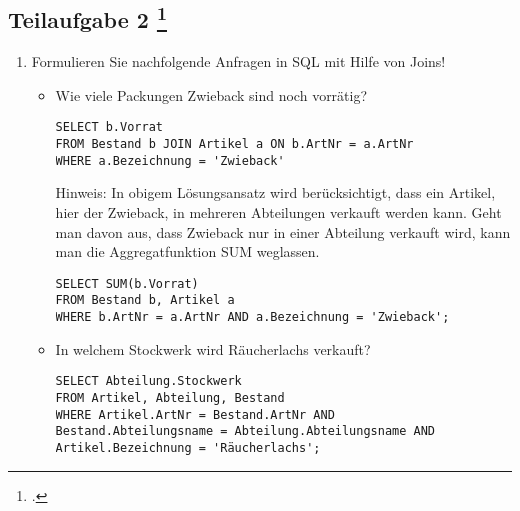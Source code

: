 \documentclass{lehramt-informatik-aufgabe}
\begin{document}
%

\subsection{Teilaufgabe 2
\footcite[Aufgabe 1: Kaufhaus again...]{db:ab:7}}

\begin{enumerate}


\item Formulieren Sie nachfolgende Anfragen in SQL mit Hilfe von Joins!

\begin{itemize}


\item Wie viele Packungen Zwieback sind noch vorrätig?

\begin{antwort}[richtig]
\begin{verbatim}
SELECT b.Vorrat
FROM Bestand b JOIN Artikel a ON b.ArtNr = a.ArtNr
WHERE a.Bezeichnung = 'Zwieback'
\end{verbatim}
\end{antwort}

\begin{antwort}[muster]
Hinweis: In obigem Lösungsansatz wird berücksichtigt, dass ein Artikel,
hier der Zwieback, in mehreren Abteilungen verkauft werden kann. Geht
man davon aus, dass Zwieback nur in einer Abteilung verkauft wird, kann
man die Aggregatfunktion SUM weglassen.
\begin{verbatim}
SELECT SUM(b.Vorrat)
FROM Bestand b, Artikel a
WHERE b.ArtNr = a.ArtNr AND a.Bezeichnung = 'Zwieback';
\end{verbatim}
\end{antwort}


\item In welchem Stockwerk wird Räucherlachs verkauft?

\begin{antwort}[muster]
\begin{verbatim}
SELECT Abteilung.Stockwerk
FROM Artikel, Abteilung, Bestand
WHERE Artikel.ArtNr = Bestand.ArtNr AND
Bestand.Abteilungsname = Abteilung.Abteilungsname AND
Artikel.Bezeichnung = 'Räucherlachs';
\end{verbatim}
\end{antwort}


\end{itemize}
\end{enumerate}
\end{document}
